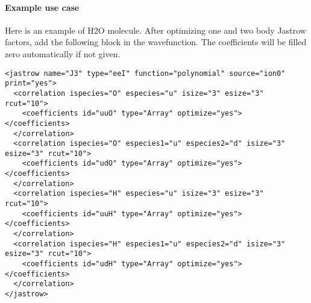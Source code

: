 \paragraph{Example use case}
Here is an example of H2O molecule. After optimizing one and two body Jastrow factors, add the following block in the wavefunction.
The coefficients will be filled zero automatically if not given.
\begin{lstlisting}[style=XML]
<jastrow name="J3" type="eeI" function="polynomial" source="ion0" print="yes">
  <correlation ispecies="O" especies="u" isize="3" esize="3" rcut="10">
    <coefficients id="uuO" type="Array" optimize="yes"> </coefficients>
  </correlation>
  <correlation ispecies="O" especies1="u" especies2="d" isize="3" esize="3" rcut="10">
    <coefficients id="udO" type="Array" optimize="yes"> </coefficients>
  </correlation>
  <correlation ispecies="H" especies="u" isize="3" esize="3" rcut="10">
    <coefficients id="uuH" type="Array" optimize="yes"> </coefficients>
  </correlation>
  <correlation ispecies="H" especies1="u" especies2="d" isize="3" esize="3" rcut="10">
    <coefficients id="udH" type="Array" optimize="yes"> </coefficients>
  </correlation>
</jastrow>
\end{lstlisting}
